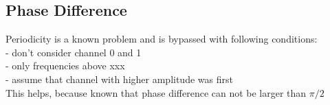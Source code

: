 \subsection*{Phase Difference}
\label{subsec:03_phase}

Periodicity is a known problem and is bypassed with following conditions:\\
- don't consider channel 0 and 1\\
- only frequencies above xxx\\
- assume that channel with higher amplitude was first\\
This helps, because known that phase difference can not be larger than $\pi/2$

